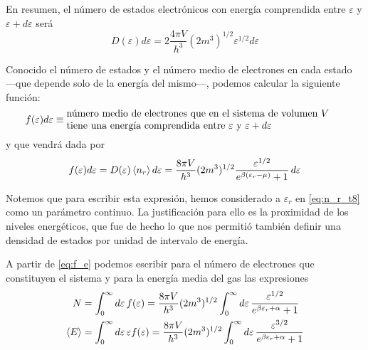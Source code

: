 En resumen, el número de estados electrónicos con energía comprendida entre $\varepsilon$ y $\varepsilon+d\varepsilon$ será
\begin{equation}
	D(\varepsilon) d\varepsilon = 2\frac{4\pi V}{h^3} (2m^3)^{1/2} \varepsilon^{1/2} d\varepsilon
\end{equation}

Conocido el número de estados y el número medio de electrones en cada estado ---que depende solo de la energía del mismo---, podemos calcular la siguiente función:
\begin{equation}
	f(\varepsilon) d\varepsilon \equiv \parbox{28em}{número medio de electrones que en el sistema de volumen $V$ \\tiene una energía comprendida entre $\varepsilon$ y $\varepsilon+d\varepsilon$} 
\end{equation}
y que vendrá dada por
\begin{equation}\label{eq:f_e}
	f(\varepsilon) d\varepsilon = D(\varepsilon)\expval{n_r} d\varepsilon = \frac{8\pi V}{h^3} (2m^3)^{1/2} \frac{\varepsilon^{1/2}}{e^{\beta(\varepsilon_r -\mu)} + 1} \dd{\varepsilon}
\end{equation}

\begin{wrapfigure}{r}{0.35\textwidth}
	\centering
	\hspace{1.8cm}
	
	\vspace{-1cm}
\end{wrapfigure}
Notemos que para escribir esta expresión, hemos considerado a $\varepsilon_r$ en \eqref{eq:n_r_t8} como un parámetro continuo.
La justificación para ello es la proximidad de los niveles energéticos, que fue de hecho lo que nos permitió también definir una densidad de estados por unidad de intervalo de energía.

A partir de \eqref{eq:f_e} podemos escribir para el número de electrones que constituyen el sistema y para la energía media del gas las expresiones
\begin{align}
	N &= \int_{0}^{\infty} \dd{\varepsilon} f(\varepsilon) = \frac{8\pi V}{h^3} (2m^3)^{1/2} \int_{0}^{\infty} \dd{\varepsilon} \frac{\varepsilon^{1/2}}{e^{\beta\varepsilon_r + \alpha} + 1} \label{eq:N_FD}\\
	\expval{E} &= \int_{0}^{\infty} \dd{\varepsilon} \varepsilon f(\varepsilon) = \frac{8\pi V}{h^3} (2m^3)^{1/2} \int_{0}^{\infty} \dd{\varepsilon} \frac{\varepsilon^{3/2}}{e^{\beta\varepsilon_r + \alpha} + 1} \label{eq:E_med_FD}
\end{align}

